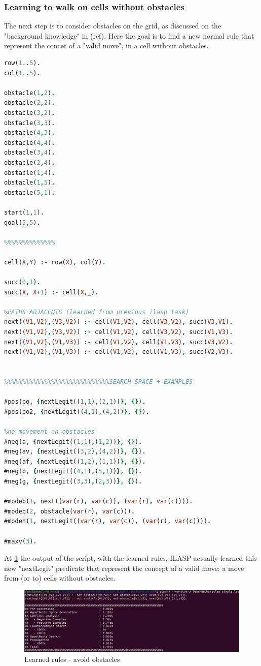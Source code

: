 \newpage
\subsubsection{Learning to walk on cells without obstacles}
The next step is to consider obstacles on the grid, as discussed on the "background knowledge" in (ref). Here the goal is to find a new normal rule that represent the concet of a "valid move", in a cell without obstacles.

\newpage

\begin{lstlisting}[language=Prolog]
%%%%%%%%%%%%%%%%%%%%%%%%%%%%%%learn how to move on cells without obstacles
row(1..5).
col(1..5).

obstacle(1,2).
obstacle(2,2).
obstacle(3,2).
obstacle(3,3).
obstacle(4,3).
obstacle(4,4).
obstacle(3,4).
obstacle(2,4).
obstacle(1,4).
obstacle(1,5).
obstacle(5,1).

start(1,1).
goal(5,5).

%%%%%%%%%%%%%%

cell(X,Y) :- row(X), col(Y).

succ(0,1).
succ(X, X+1) :- cell(X,_).

%PATHS ADJACENTS (learned from previous ilasp task)
next((V1,V2),(V3,V2)) :- cell(V1,V2), cell(V3,V2), succ(V3,V1).
next((V1,V2),(V3,V2)) :- cell(V1,V2), cell(V3,V2), succ(V1,V3).
next((V1,V2),(V1,V3)) :- cell(V1,V2), cell(V1,V3), succ(V3,V2).
next((V1,V2),(V1,V3)) :- cell(V1,V2), cell(V1,V3), succ(V2,V3).


%%%%%%%%%%%%%%%%%%%%%%%%%%%%%SEARCH_SPACE + EXAMPLES

#pos(po, {nextLegit((1,1),(2,1))}, {}).
#pos(po2, {nextLegit((4,1),(4,2))}, {}).

%no movement on obstacles
#neg(a, {nextLegit((1,1),(1,2))}, {}).
#neg(av, {nextLegit((3,2),(4,2))}, {}).
#neg(af, {nextLegit((1,2),(1,1))}, {}).
#neg(b, {nextLegit((4,1),(5,1))}, {}).
#neg(g, {nextLegit((3,3),(2,3))}, {}).

#modeb(1, next((var(r), var(c)), (var(r), var(c)))).
#modeb(2, obstacle(var(r), var(c))).
#modeh(1, nextLegit((var(r), var(c)), (var(r), var(c)))).

#maxv(3).
\end{lstlisting}
At \ref{fig:asd2} the output of the script, with the learned rules, ILASP actually learned this new "nextLegit" predicate that represent the concept of a valid move: a move from (or to) cells without obstacles.

\begin{figure}
	\centering
	\includegraphics[scale=0.45]{img/learn_noObstacles.png}
	\caption{Learned rules - avoid obstacles}\label{fig:asd2}
\end{figure}

